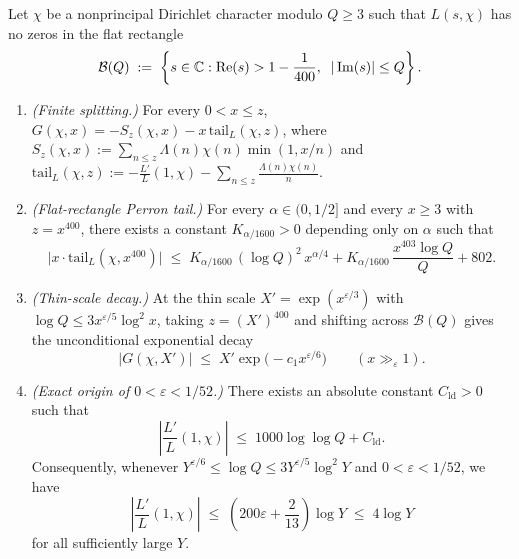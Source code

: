 \begin{proposition}
\label{prop:04:thin-decay}
Let $\chi$ be a nonprincipal Dirichlet character modulo $Q \ge 3$ such that $L(s, \chi)$ has no zeros in the flat rectangle
\[
  \mathcal{B}(Q) \;:=\; \left\{s \in \mathbb{C} : \operatorname{Re}(s) > 1 - \frac{1}{400},\;\; |\operatorname{Im}(s)| \le Q\right\}.
\]
\begin{enumerate}[label=\textup{(\roman*)}]
\item \emph{(Finite splitting.)} For every $0 < x \le z$, $G(\chi, x) = -S_z(\chi, x) - x\,\mathrm{tail}_L(\chi, z)$, where $S_z(\chi, x) := \sum_{n \le z} \Lambda(n)\chi(n)\min(1, x/n)$ and $\mathrm{tail}_L(\chi, z) := -\frac{L'}{L}(1, \chi) - \sum_{n \le z} \frac{\Lambda(n)\chi(n)}{n}$.
\item \emph{(Flat-rectangle Perron tail.)} For every $\alpha \in (0, 1/2]$ and every $x \ge 3$ with $z = x^{400}$, there exists a constant $K_{\alpha/1600} > 0$ depending only on $\alpha$ such that
  \begin{equation}
  \label{eq:04:perron-tail}
    \bigl|x \cdot \mathrm{tail}_L(\chi, x^{400})\bigr|
    \;\le\; K_{\alpha/1600}\,(\log Q)^2\, x^{\alpha/4} + K_{\alpha/1600}\,\frac{x^{403}\log Q}{Q} + 802.
  \end{equation}
\item \emph{(Thin-scale decay.)} At the thin scale $X' = \exp(x^{\varepsilon/3})$ with $\log Q \le 3 x^{\varepsilon/5}\log^2 x$, taking $z = (X')^{400}$ and shifting across $\mathcal{B}(Q)$ gives the unconditional exponential decay
  \[
    \bigl|G(\chi, X')\bigr| \;\le\; X' \exp\!\bigl(-c_1 x^{\varepsilon/6}\bigr) \qquad (x \gg_\varepsilon 1).
  \]
\item \emph{(Exact origin of $0 < \varepsilon < 1/52$.)} There exists an absolute constant $C_{\mathrm{ld}} > 0$ such that
  \begin{equation}
  \label{eq:04:lprime-bound}
    \left|\frac{L'}{L}(1, \chi)\right| \;\le\; 1000\log\log Q + C_{\mathrm{ld}}.
  \end{equation}
  Consequently, whenever $Y^{\varepsilon/6} \le \log Q \le 3 Y^{\varepsilon/5}\log^2 Y$ and $0 < \varepsilon < 1/52$, we have
  \begin{equation}
  \label{eq:04:eps-52}
    \left|\frac{L'}{L}(1, \chi)\right| \;\le\; \left(200\varepsilon + \frac{2}{13}\right)\log Y \;\le\; 4\log Y
  \end{equation}
  for all sufficiently large $Y$.
\end{enumerate}
\end{proposition}

